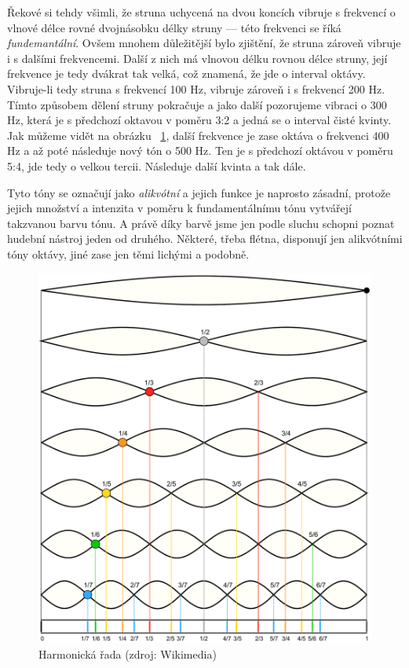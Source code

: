 \documentclass[12pt]{article}
\begin{document}
Řekové si tehdy všimli, že struna uchycená na dvou koncích vibruje s frekvencí o vlnové délce rovné dvojnásobku délky struny — této frekvenci se říká \emph{fundemantální}. Ovšem mnohem důležitější bylo zjištění, že struna zároveň vibruje i s dalšími frekvencemi. Další z nich má vlnovou délku rovnou délce struny, její frekvence je tedy dvákrat tak velká, což znamená, že jde o interval oktávy. Vibruje-li tedy struna s frekvencí 100 Hz, vibruje zároveň i s frekvencí 200 Hz. Tímto způsobem dělení struny pokračuje a jako další pozorujeme vibraci o 300 Hz, která je s předchozí oktavou v poměru 3:2 a jedná se o interval čisté kvinty. Jak můžeme vidět na obrázku ~\ref{fig:harmonics}, další frekvence je zase oktáva o frekvenci 400 Hz a až poté následuje nový tón o 500 Hz. Ten je s předchozí oktávou v poměru 5:4, jde tedy o velkou tercii. Následuje další kvinta a tak dále.

Tyto tóny se označují jako \emph{alikvótní} a jejich funkce je naprosto zásadní, protože jejich množství a intenzita v poměru k fundamentálnímu tónu vytvářejí takzvanou barvu tónu. A právě díky barvě jsme jen podle sluchu schopni poznat hudební nástroj jeden od druhého. Některé, třeba flétna, disponují jen alikvótními tóny oktávy, jiné zase jen těmi lichými a podobně.

\begin{figure}[p]
\centering
\includegraphics[width = .9 \textwidth]{harmonics.pdf}
\caption{Harmonická řada (zdroj: Wikimedia)}
\label{fig:harmonics}
\end{figure}
\end{document}
